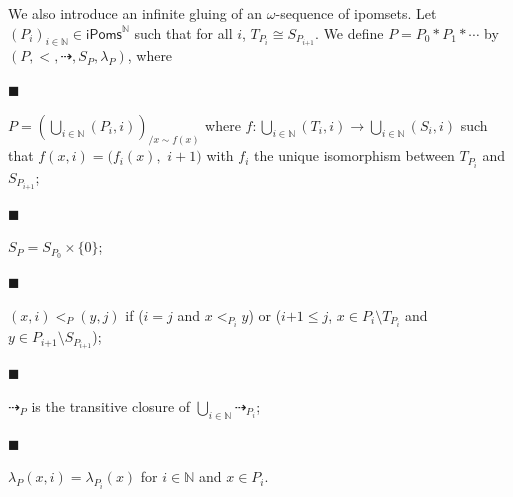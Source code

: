  
We also introduce an infinite gluing of an $\omega$-sequence of ipomsets. Let $(P_{i})_{i\in\mathbb{N}}\in\mathsf{iPoms}^{\mathbb{N}}$ such that for all $i$, $T_{P_{i}}\cong S_{P_{i\text{+}1}}$. We define $P=P_{0}*P_{1}*\cdots$ by $(P,<,\dashrightarrow,S_{P},\lambda_{P})$, where\par
  
\par\noindent  $\blacksquare$ 
 
$P=(\bigcup\nolimits_{i\in\mathbb{N}}(P_{i},i))_{/x\sim f(x)}$ where $f:\bigcup\nolimits_{i\in\mathbb{N}}(T_{i},i)\rightarrow\bigcup\nolimits_{i\in\mathbb{N}}(S_{i},i)$ such that $f(x,i)=(f_{i}(x),$ $i+1)$ with $f_{i}$ the unique isomorphism between $T_{P_{i}}$ and $S_{P_{i\text{+}1}}$;\par
 
 
 
\par\noindent  $\blacksquare$ 
 
$S_{P}=S_{P_{0}}\times{\{0\}}$;\par
 
 
 
\par\noindent  $\blacksquare$ 
 
$(x,i)<_{P}(y,j)$ if ($i=j$ and $x<_{P_{i}}y$) or ($i\text{+}1\leqslant j$, $x\in P_{i}\setminus T_{P_{i}}$ and $y\in P_{i\text{+}1}\setminus S_{P_{i\text{+}1}}$);\par
 
 
 
\par\noindent  $\blacksquare$ 
 
$\dashrightarrow_{P}$ is the transitive closure of $\bigcup_{i\in\mathbb{N}}\dashrightarrow_{P_{i}}$;\par
 
 
 
\par\noindent  $\blacksquare$ 
 
$\lambda_{P}(x,i)=\lambda_{P_{i}}(x)$ for $i\in\mathbb{N}$ and $x\in P_{i}$.\par
 
 
  
 
 
